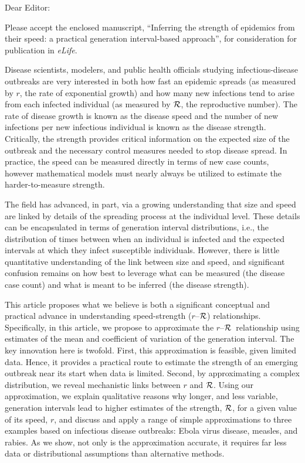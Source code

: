 \documentclass[12pt]{letter}
\newcommand{\rR}{\mbox{$r$--$\cal R$}}
\newcommand{\RR}{\ensuremath{{\cal R}}}
\begin{document}
\date{\today}

\signature{Sang Woo Park, David Champredon, Joshua S. Weitz, and Jonathan Dushoff (corresponding author)}

\begin{letter}{
}

\opening{Dear Editor:}

Please accept the enclosed manuscript, ``Inferring the strength of epidemics from their speed: a practical generation interval-based approach'', for consideration for publication in \emph{eLife}.

Disease scientists, modelers, and public health officials studying infectious-disease outbreaks are very interested in both how fast an epidemic spreads (as measured by $r$, the rate of exponential growth) and how many new infections tend to arise from each infected individual (as measured by \RR, the reproductive number). 
The rate of disease growth is known as the disease speed and the number of new infections per new infectious individual is known as the disease strength.  
Critically, the strength provides critical information on the expected size of the outbreak and the necessary control measures needed to stop disease spread.  
In practice, the speed can be measured directly in terms of new case counts, however mathematical models must nearly always be utilized to estimate the harder-to-measure strength.

The field has advanced, in part, via  a growing understanding that size and speed are linked by details of the spreading process at the individual level. These details can be encapsulated in terms of generation interval distributions, i.e., the distribution of times between when an individual is infected and the expected intervals at which they infect susceptible individuals.  However, there is little quantitative understanding of the link between size and speed, and significant confusion remains on how best to leverage what can be measured (the disease case count) and what is meant to be inferred (the disease strength). 

This article proposes what we believe is both a significant conceptual and practical advance in understanding speed-strength (\rR) relationships. Specifically, in this article, we propose to approximate the \rR\ relationship using estimates of the mean and coefficient of variation of the generation interval. The key innovation here is twofold. First, this approximation is feasible, given limited data. Hence, it provides a practical route to estimate the strength of an emerging outbreak near its start when data is limited. Second, by approximating a complex distribution, we reveal mechanistic links between $r$ and \RR. Using our approximation, we explain qualitative reasons why longer, and less variable, generation intervals lead to higher estimates of the strength, \RR, for a given value of its speed, $r$, and discuss and apply a range of simple approximations to three examples based on infectious disease outbreaks: Ebola virus disease, measles, and rabies. As we show, not only is the approximation accurate, it requires far less data or distributional assumptions than alternative methods.


\end{letter}
\end{document}
